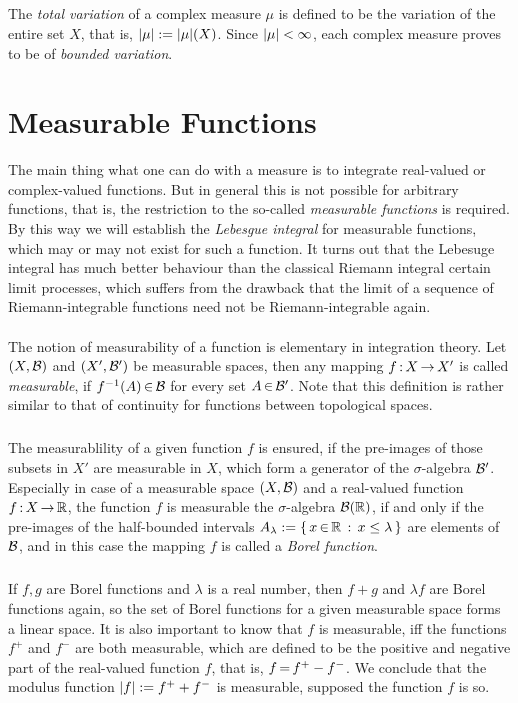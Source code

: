 \documentclass[11pt,twoside]{article}
\begin{document}
\subparagraph{}
The \textit{total variation} of a complex measure $\mu$
is defined to be the variation of the entire set $X$,
that is,
$\abs{\mu} := \abs{\mu} (X)$.
Since $\abs{\mu} < \infty$,
each complex measure proves to be of \textit{bounded variation}.

\section{Measurable Functions}
The main thing what one can do with a measure is
to integrate real-valued or complex-valued functions.
But in general this is not possible for arbitrary functions,
that is,
the restriction to the so-called \textit{measurable functions} is required.
By this way
we will establish the \textit{Lebesgue integral} for measurable functions,
which may or may not exist for such a function.
It turns out
that the Lebesuge integral has much better behaviour
than the classical Riemann integral {\wrt} certain limit processes,
which suffers from the drawback
that the limit of a sequence of Riemann-integrable functions
need not be Riemann-integrable again.

\paragraph{}
The notion of measurability of a function is elementary in integration theory.
Let $(X,{\mathcal{B}})$ and $(X',{\mathcal{B}}')$ be measurable spaces,
then any mapping $f {\,:\,} X {\,\to\,} X'$ is called \textit{measurable},
if $f^{-1}(A) {\,\in\,} {\mathcal{B}}$ for every set $A {\,\in\,} {\mathcal{B}}'$.
Note
that this definition is rather similar to that of continuity
for functions between topological spaces.

\subparagraph{}
The measurablility of a given function $f$ is ensured,
if the pre-images of those subsets in $X'$ are measurable in $X$,
which form a generator of the $\sigma$-algebra ${\mathcal{B}}'$.
Especially in case of a measurable space $(X,{\mathcal{B}})$
and a real-valued function $f {\,:\,} X {\,\to\,} {\mathbb{R}}$,
the function $f$ is measurable {\wrt} the $\sigma$-algebra
${\mathcal{B}}({\mathbb{R}})$, if and only if the pre-images of the half-bounded intervals
$A_{\lambda} := \{ \, x {\,\in\,} {\mathbb{R}} \,: \, x \leq \lambda \, \}$ are elements of ${\mathcal{B}}$,
and in this case the mapping $f$ is called a \textit{Borel function}.

\subparagraph{}
If $f,g$ are Borel functions and $\lambda$ is a real number,
then $f+g$ and $\lambda f$ are Borel functions again,
so the set of Borel functions for a given measurable space
forms a linear space.
It is also important to know that $f$ is measurable,
iff the functions $f^+$ and $f^-$ are both measurable,
which are defined to be the positive and negative part
of the real-valued function $f$,
that is,
$f {\,=\,} f^+ - f^-$.
We conclude
that the modulus function $\abs{f} := f^+ + f^-$ is measurable,
supposed the function $f$ is so.
\end{document}
